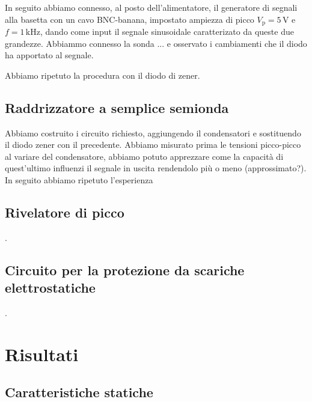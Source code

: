 \documentclass[a4paper]{article}
\begin{document}
{{			In seguito abbiamo connesso, al posto dell'alimentatore, il generatore di segnali alla basetta con un cavo BNC-banana, impostato ampiezza di picco $ V_{\mathrm{p}} = 5 \, \mathrm{V} $ e $ f = 1 \, \mathrm{kHz} $, dando come input il segnale sinusoidale caratterizato da queste due grandezze.
			Abbiammo connesso la sonda ... e osservato i cambiamenti che il diodo ha apportato al segnale.
			
			Abbiamo ripetuto la procedura con il diodo di zener.
		\subsection{Raddrizzatore a semplice semionda}
			Abbiamo costruito i circuito richiesto, aggiungendo il condensatori e sostituendo il diodo zener con il precedente.
			Abbiamo misurato prima le tensioni picco-picco al variare del condensatore, abbiamo potuto apprezzare come la capacità di quest'ultimo influenzi il segnale in uscita rendendolo più o meno (approssimato?).
			In seguito abbiamo ripetuto l'esperienza 
			
		\subsection{Rivelatore di picco}
			.
		\subsection{Circuito per la protezione da scariche elettrostatiche}
			.
	\section{Risultati}
		\subsection{Caratteristiche statiche}
}}
\end{document}
